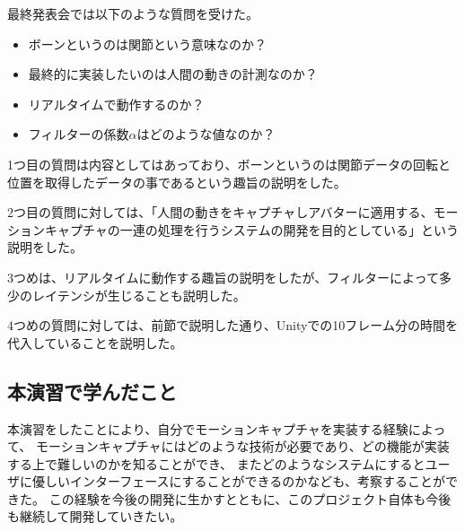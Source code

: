 \documentclass[a4j]{jsarticle}
\begin{document}
最終発表会では以下のような質問を受けた。

\begin{itemize}
  \item ボーンというのは関節という意味なのか？
  \item 最終的に実装したいのは人間の動きの計測なのか？
  \item リアルタイムで動作するのか？
  \item フィルターの係数$\alpha$はどのような値なのか？
\end{itemize}

1つ目の質問は内容としてはあっており、ボーンというのは関節データの回転と位置を取得したデータの事であるという趣旨の説明をした。

2つ目の質問に対しては、「人間の動きをキャプチャしアバターに適用する、モーションキャプチャの一連の処理を行うシステムの開発を目的としている」という説明をした。

3つめは、リアルタイムに動作する趣旨の説明をしたが、フィルターによって多少のレイテンシが生じることも説明した。

4つめの質問に対しては、前節で説明した通り、Unityでの10フレーム分の時間を代入していることを説明した。

\subsection{本演習で学んだこと}

本演習をしたことにより、自分でモーションキャプチャを実装する経験によって、
モーションキャプチャにはどのような技術が必要であり、どの機能が実装する上で難しいのかを知ることができ、
またどのようなシステムにするとユーザに優しいインターフェースにすることができるのかなども、考察することができた。
この経験を今後の開発に生かすとともに、このプロジェクト自体も今後も継続して開発していきたい。
\end{document}
